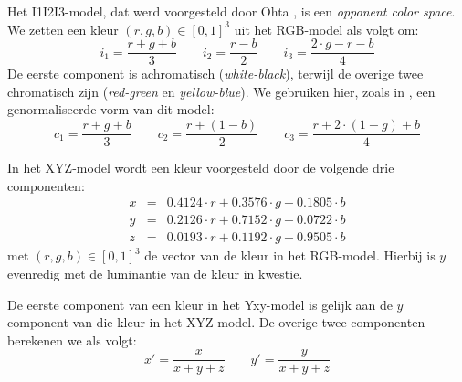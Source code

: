 Het I1I2I3-model, dat werd voorgesteld door Ohta 
\cite{ohta:color_info_for_region_segm}, is een \emph{opponent color space}. 
We zetten een kleur $(r,g,b) \in 
[0,1]^3$ uit het RGB-model als volgt om: $$
i_1 = \frac{r+g+b}{3} \qquad i_2 = \frac{r-b}{2} \qquad i_3 = \frac{2 \cdot g - 
r - b}{4}
$$ De eerste component is achromatisch (\emph{white-black}), terwijl de overige 
twee chromatisch zijn (\emph{red-green} en \emph{yellow-blue}).
We gebruiken hier, zoals in \cite{wang:cbir_using_daubechies_wavelets}, een 
genormaliseerde vorm van dit model: $$
c_1 = \frac{r+g+b}{3} \qquad c_2 = \frac{r + (1 - b)}{2} \qquad c_3 = \frac{r + 
2 \cdot (1 - g) + b}{4}
$$ 

In het XYZ-model wordt een kleur voorgesteld door de volgende drie componenten: 
$$
\begin{array}{rcl}
x & = & 0.4124 \cdot r + 0.3576 \cdot g + 0.1805 \cdot b \\
y & = & 0.2126 \cdot r + 0.7152 \cdot g + 0.0722 \cdot b \\
z & = & 0.0193 \cdot r + 0.1192 \cdot g + 0.9505 \cdot b
\end{array}
$$ met $(r,g,b) \in [0,1]^3$ de vector van de kleur in het RGB-model. Hierbij 
is $y$ evenredig met de luminantie van de kleur in kwestie. 

De eerste component van een kleur in het Yxy-model is gelijk aan de $y$ 
component van die kleur in het XYZ-model. De overige twee componenten berekenen 
we als volgt: $$ x' = \frac{x}{x+y+z} \qquad y' = \frac{y}{x+y+z} $$ 

